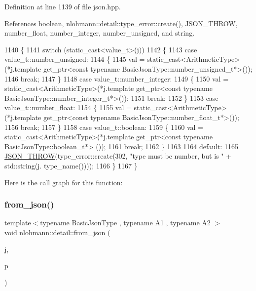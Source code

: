 Definition at line 1139 of file json.\+hpp.



References boolean, nlohmann\+::detail\+::type\+\_\+error\+::create(), J\+S\+O\+N\+\_\+\+T\+H\+R\+OW, number\+\_\+float, number\+\_\+integer, number\+\_\+unsigned, and string.


\begin{DoxyCode}
1140 \{
1141     \textcolor{keywordflow}{switch} (static\_cast<value\_t>(j))
1142     \{
1143         \textcolor{keywordflow}{case} value\_t::number\_unsigned:
1144         \{
1145             val = \textcolor{keyword}{static\_cast<}ArithmeticType\textcolor{keyword}{>}(*j.template get\_ptr<const typename
       BasicJsonType::number\_unsigned\_t*>());
1146             \textcolor{keywordflow}{break};
1147         \}
1148         \textcolor{keywordflow}{case} value\_t::number\_integer:
1149         \{
1150             val = \textcolor{keyword}{static\_cast<}ArithmeticType\textcolor{keyword}{>}(*j.template get\_ptr<const typename
       BasicJsonType::number\_integer\_t*>());
1151             \textcolor{keywordflow}{break};
1152         \}
1153         \textcolor{keywordflow}{case} value\_t::number\_float:
1154         \{
1155             val = \textcolor{keyword}{static\_cast<}ArithmeticType\textcolor{keyword}{>}(*j.template get\_ptr<const typename
       BasicJsonType::number\_float\_t*>());
1156             \textcolor{keywordflow}{break};
1157         \}
1158         \textcolor{keywordflow}{case} value\_t::boolean:
1159         \{
1160             val = \textcolor{keyword}{static\_cast<}ArithmeticType\textcolor{keyword}{>}(*j.template get\_ptr<const typename BasicJsonType::boolean\_t*>
      ());
1161             \textcolor{keywordflow}{break};
1162         \}
1163 
1164         \textcolor{keywordflow}{default}:
1165             \hyperlink{json_8hpp_a6c274f6db2e65c1b66c7d41b06ad690f}{JSON\_THROW}(type\_error::create(302, \textcolor{stringliteral}{"type must be number, but is "} + std::string(j.
      type\_name())));
1166     \}
1167 \}
\end{DoxyCode}
Here is the call graph for this function\+:
\mbox{\label{namespacenlohmann_1_1detail_aae9f9c2601074e323d49428132cc293d}} 
\subsubsection{\texorpdfstring{from\+\_\+json()}{from\_json()}\hspace{0.1cm}{\footnotesize\ttfamily [13/14]}}
{\footnotesize\ttfamily template$<$typename Basic\+Json\+Type , typename A1 , typename A2 $>$ \\
void nlohmann\+::detail\+::from\+\_\+json (\begin{DoxyParamCaption}\item[{const Basic\+Json\+Type \&}]{j,  }\item[{std\+::pair$<$ A1, A2 $>$ \&}]{p }\end{DoxyParamCaption})}



